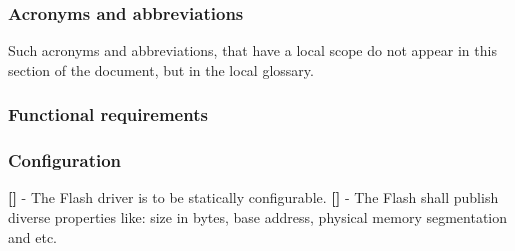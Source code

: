 \subsubsection{Acronyms and abbreviations}
Such acronyms and abbreviations, that have a local scope do not appear in this section of the document, but in the local glossary.
\subsubsection{Functional requirements}
\subsubsection{Configuration}
{\bf []} - The \mbox{Flash} driver is to be statically configurable.\newline
\newline
{\bf []} - The \mbox{Flash} shall publish diverse properties like: size in bytes, base address, physical memory segmentation and etc.

